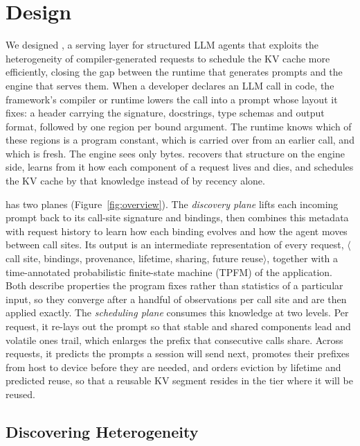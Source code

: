 \section{Design}
\label{sec:design}

We designed \sysname, a serving layer for structured LLM agents that exploits the heterogeneity of compiler-generated requests to schedule the KV cache more efficiently, closing the gap between the runtime that generates prompts and the engine that serves them. When a developer declares an LLM call in code, the framework's compiler or runtime lowers the call into a prompt whose layout it fixes: a header carrying the signature, docstrings, type schemas and output format, followed by one region per bound argument. The runtime knows which of these regions is a program constant, which is carried over from an earlier call, and which is fresh. The engine sees only bytes. \sysname recovers that structure on the engine side, learns from it how each component of a request lives and dies, and schedules the KV cache by that knowledge instead of by recency alone.

\sysname has two planes (Figure~\ref{fig:overview}). The \emph{discovery plane} lifts each incoming prompt back to its call-site signature and bindings, then combines this metadata with request history to learn how each binding evolves and how the agent moves between call sites. Its output is an intermediate representation of every request, $\langle$call site, bindings, provenance, lifetime, sharing, future reuse$\rangle$, together with a time-annotated probabilistic finite-state machine (TPFM) of the application. Both describe properties the program fixes rather than statistics of a particular input, so they converge after a handful of observations per call site and are then applied exactly. The \emph{scheduling plane} consumes this knowledge at two levels. Per request, it re-lays out the prompt so that stable and shared components lead and volatile ones trail, which enlarges the prefix that consecutive calls share. Across requests, it predicts the prompts a session will send next, promotes their prefixes from host to device before they are needed, and orders eviction by lifetime and predicted reuse, so that a reusable KV segment resides in the tier where it will be reused.

\subsection{Discovering Heterogeneity}
\label{sec:discovery}

